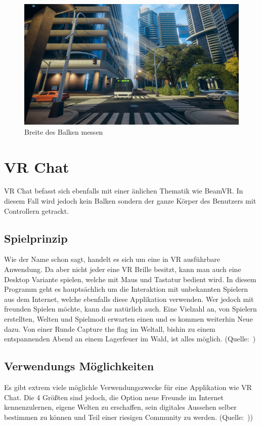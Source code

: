 \begin {figure}
    \includegraphics[scale=0.7]{pics/richiesplankexperience_world}
    \caption{Breite des Balken messen}
    \label{fig:richiesplankexperience_world}
\end {figure}


\section{VR Chat}
\label{sec:vrchat}
VR Chat befasst sich ebenfalls mit einer \"anlichen Thematik wie BeamVR.
In diesem Fall wird jedoch kein Balken sondern der ganze K\"orper des Benutzers mit Controllern getrackt.

\subsection{Spielprinzip}
\label{sec:vrchat_principle}
Wie der Name schon sagt, handelt es sich um eine in VR ausf\"uhrbare Anwendung.
Da aber nicht jeder eine VR Brille besitzt, kann man auch eine Desktop Variante spielen, welche mit Maus und Tastatur bedient wird.
In diesem Programm geht es haupts\"achlich um die Interaktion mit unbekannten Spielern aus dem Internet,
welche ebenfalls diese Applikation verwenden.
Wer jedoch mit freunden Spielen möchte, kann das nat\"urlich auch.
Eine Vielzahl an, von Spielern erstellten, Welten und Spielmodi erwarten einen und es kommen weiterhin Neue dazu.
Von einer Runde Capture the flag im Weltall, bishin zu einem entspannenden Abend an einem Lagerfeuer im Wald, ist alles möglich.
(Quelle:~\cite{VRChat_2021_Steam})

\subsection{Verwendungs M\"oglichkeiten}
\label{sec:vrchat_usecases}
Es gibt extrem viele m\"oglichle Verwendungszwecke für eine Applikation wie VR Chat.
Die 4 Gr\"oßten sind jedoch, die Option neue Freunde im Internet kennenzulernen, eigene Welten zu erschaffen, sein digitales Aussehen selber bestimmen zu k\"onnen und Teil einer riesigen Community zu werden.
(Quelle:~\cite{VRChat_2021}))

